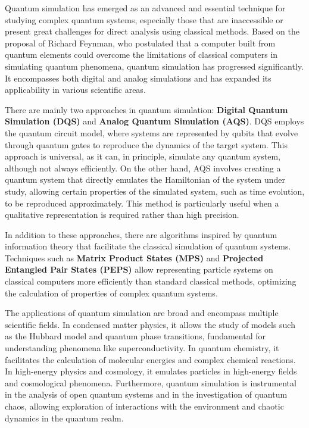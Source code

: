 Quantum simulation has emerged as an advanced and essential technique for studying complex quantum systems, especially those that are inaccessible or present great challenges for direct analysis using classical methods. Based on the proposal of Richard Feynman, who postulated that a computer built from quantum elements could overcome the limitations of classical computers in simulating quantum phenomena, quantum simulation has progressed significantly. It encompasses both digital and analog simulations and has expanded its applicability in various scientific areas.

There are mainly two approaches in quantum simulation: \textbf{Digital Quantum Simulation (DQS)} and \textbf{Analog Quantum Simulation (AQS)}. DQS employs the quantum circuit model, where systems are represented by qubits that evolve through quantum gates to reproduce the dynamics of the target system. This approach is universal, as it can, in principle, simulate any quantum system, although not always efficiently. On the other hand, AQS involves creating a quantum system that directly emulates the Hamiltonian of the system under study, allowing certain properties of the simulated system, such as time evolution, to be reproduced approximately. This method is particularly useful when a qualitative representation is required rather than high precision.

In addition to these approaches, there are algorithms inspired by quantum information theory that facilitate the classical simulation of quantum systems. Techniques such as \textbf{Matrix Product States (MPS)} and \textbf{Projected Entangled Pair States (PEPS)} allow representing particle systems on classical computers more efficiently than standard classical methods, optimizing the calculation of properties of complex quantum systems.

The applications of quantum simulation are broad and encompass multiple scientific fields. In condensed matter physics, it allows the study of models such as the Hubbard model and quantum phase transitions, fundamental for understanding phenomena like superconductivity. In quantum chemistry, it facilitates the calculation of molecular energies and complex chemical reactions. In high-energy physics and cosmology, it emulates particles in high-energy fields and cosmological phenomena. Furthermore, quantum simulation is instrumental in the analysis of open quantum systems and in the investigation of quantum chaos, allowing exploration of interactions with the environment and chaotic dynamics in the quantum realm.

